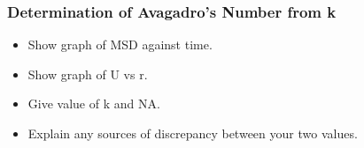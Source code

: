 \documentclass[12pt,a4paper,twoside]{article}
\begin{document}
\subsubsection{Determination of Avagadro's Number from k}
 \begin{itemize}
	\item Show graph of MSD against time.
	\item Show graph of U vs r.
	\item Give value of k and NA.
	\item Explain any sources of discrepancy between your two values.
\end{itemize}
\end{document}
